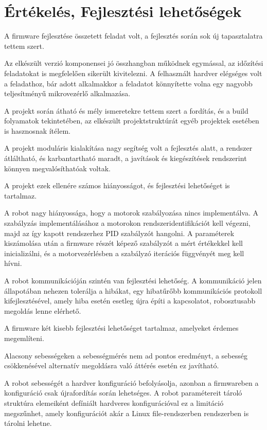 \section{Értékelés, Fejlesztési lehetőségek}

A firmware fejlesztése összetett feladat volt, a fejlesztés során sok új
tapasztalatra tettem szert.

\medskip

Az elkészült verzió komponensei jó összhangban működnek egymással, az időzítési
feladatokat is megfelelően sikerült kivitelezni. A felhasznált hardver elégséges
volt a feladathoz, bár adott alkalmakkor a feladatot könnyítette volna egy
nagyobb teljesítményű mikrovezérlő alkalmazása.

A projekt során átható és mély ismeretekre tettem szert a fordítás, és a build
folyamatok tekintetében, az elkészült projektstruktúrát egyéb projektek
esetében is hasznosnak ítélem.  

A projekt moduláris kialakítása nagy segítség volt a fejlesztés alatt, a rendszer
átláltható, és karbantartható maradt, a javítások és kiegészítések rendszerint
könnyen megvalósíthatóak voltak.

\medskip

A projekt ezek ellenére számos hiányosságot, és fejlesztési lehetőséget is
tartalmaz. 

A robot nagy hiányossága, hogy a motorok szabályozása nincs implementálva. A
szabályzás implementálásához a motorokon rendszeridentifikációt kell végezni,
majd az így kapott rendszerhez PID szabályzót hangolni. A paraméterek kiszámolása
után a firmware részét képező szabályzót a mért értékekkel kell inicializálni, és
a motorvezérlésben a szabályzó iterációs függvényét meg kell hívni.

\medskip

A robot kommunikációján szintén van fejlesztési lehetőség. A kommunikáció jelen
állapotában nehezen tolerálja a hibákat, egy hibatűrőbb kommunikációs protokoll
kifejlesztésével, amely hiba esetén esetleg újra építi a kapcsolatot,
robosztusabb megoldás lenne elérhető. 

\medskip

A firmware két kisebb fejlesztési lehetőséget tartalmaz, amelyeket érdemes
megemlíteni.

Alacsony sebességeken a sebességmérés nem ad pontos eredményt, a
sebesség csökkenésével alternatív megoldásra való áttérés esetén ez javítható.

A robot sebességét a hardver konfiguráció befolyásolja, azonban a
firmwareben a konfiguráció csak újrafordítás során lehetséges. A robot
paramétereit tároló struktúra elemeiként defíniált hardveres
konfigurációval ez a limitáció megszűnhet, amely konfigurációt akár a
Linux file-rendszerben rendszerben is tárolni lehetne.

